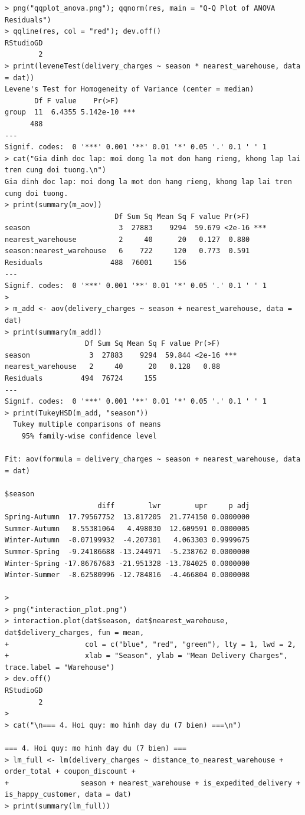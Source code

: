 \documentclass[12pt, a4paper]{article}
\begin{document}
\begin{lstlisting}
> png("qqplot_anova.png"); qqnorm(res, main = "Q-Q Plot of ANOVA Residuals")
> qqline(res, col = "red"); dev.off()
RStudioGD 
        2 
> print(leveneTest(delivery_charges ~ season * nearest_warehouse, data = dat))
Levene's Test for Homogeneity of Variance (center = median)
       Df F value    Pr(>F)    
group  11  6.4355 5.142e-10 ***
      488                      
---
Signif. codes:  0 '***' 0.001 '**' 0.01 '*' 0.05 '.' 0.1 ' ' 1
> cat("Gia dinh doc lap: moi dong la mot don hang rieng, khong lap lai tren cung doi tuong.\n")
Gia dinh doc lap: moi dong la mot don hang rieng, khong lap lai tren cung doi tuong.
> print(summary(m_aov))
                          Df Sum Sq Mean Sq F value Pr(>F)    
season                     3  27883    9294  59.679 <2e-16 ***
nearest_warehouse          2     40      20   0.127  0.880    
season:nearest_warehouse   6    722     120   0.773  0.591    
Residuals                488  76001     156                   
---
Signif. codes:  0 '***' 0.001 '**' 0.01 '*' 0.05 '.' 0.1 ' ' 1
> 
> m_add <- aov(delivery_charges ~ season + nearest_warehouse, data = dat)
> print(summary(m_add))
                   Df Sum Sq Mean Sq F value Pr(>F)    
season              3  27883    9294  59.844 <2e-16 ***
nearest_warehouse   2     40      20   0.128   0.88    
Residuals         494  76724     155                   
---
Signif. codes:  0 '***' 0.001 '**' 0.01 '*' 0.05 '.' 0.1 ' ' 1
> print(TukeyHSD(m_add, "season"))                       
  Tukey multiple comparisons of means
    95% family-wise confidence level

Fit: aov(formula = delivery_charges ~ season + nearest_warehouse, data = dat)

$season
                      diff        lwr        upr     p adj
Spring-Autumn  17.79567752  13.817205  21.774150 0.0000000
Summer-Autumn   8.55381064   4.498030  12.609591 0.0000005
Winter-Autumn  -0.07199932  -4.207301   4.063303 0.9999675
Summer-Spring  -9.24186688 -13.244971  -5.238762 0.0000000
Winter-Spring -17.86767683 -21.951328 -13.784025 0.0000000
Winter-Summer  -8.62580996 -12.784816  -4.466804 0.0000008

> 
> png("interaction_plot.png")
> interaction.plot(dat$season, dat$nearest_warehouse, dat$delivery_charges, fun = mean,
+                  col = c("blue", "red", "green"), lty = 1, lwd = 2,
+                  xlab = "Season", ylab = "Mean Delivery Charges", trace.label = "Warehouse")
> dev.off()
RStudioGD 
        2 
> 
> cat("\n=== 4. Hoi quy: mo hinh day du (7 bien) ===\n")

=== 4. Hoi quy: mo hinh day du (7 bien) ===
> lm_full <- lm(delivery_charges ~ distance_to_nearest_warehouse + order_total + coupon_discount +
+                 season + nearest_warehouse + is_expedited_delivery + is_happy_customer, data = dat)
> print(summary(lm_full))


\end{lstlisting}
\end{document}
